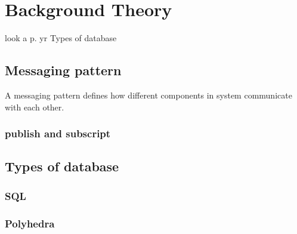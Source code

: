 \section{Background Theory}

look a p. yr
Types of database

\subsection{Messaging pattern}
A messaging pattern defines how different components in system communicate with each other.

	\subsubsection{publish and subscript}


\subsection{Types of database}

  \subsubsection{SQL}

  \subsubsection{Polyhedra}